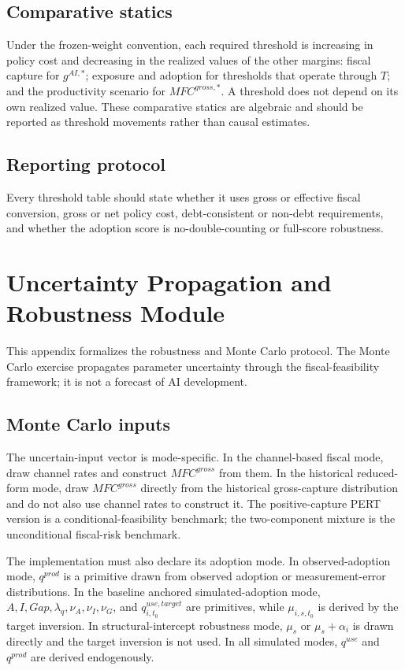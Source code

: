 \documentclass[11pt,a4paper]{article}
\begin{document}
\subsection{Comparative statics}

Under the frozen-weight convention, each required threshold is increasing in policy cost and decreasing in the realized values of the other margins: fiscal capture for $g^{AI,*}$; exposure and adoption for thresholds that operate through $T$; and the productivity scenario for $MFC^{gross,*}$. A threshold does not depend on its own realized value. These comparative statics are algebraic and should be reported as threshold movements rather than causal estimates.

\subsection{Reporting protocol}

Every threshold table should state whether it uses gross or effective fiscal conversion, gross or net policy cost, debt-consistent or non-debt requirements, and whether the adoption score is no-double-counting or full-score robustness.


\section{Uncertainty Propagation and Robustness Module}\label{app:uncertainty_module}

This appendix formalizes the robustness and Monte Carlo protocol. The Monte Carlo exercise propagates parameter uncertainty through the fiscal-feasibility framework; it is not a forecast of AI development.


\subsection{Monte Carlo inputs}

The uncertain-input vector is mode-specific. In the channel-based fiscal mode, draw channel rates and construct $MFC^{gross}$ from them. In the historical reduced-form mode, draw $MFC^{gross}$ directly from the historical gross-capture distribution and do not also use channel rates to construct it. The positive-capture PERT version is a conditional-feasibility benchmark; the two-component mixture is the unconditional fiscal-risk benchmark.

The implementation must also declare its adoption mode. In observed-adoption mode, $q^{prod}$ is a primitive drawn from observed adoption or measurement-error distributions. In the baseline anchored simulated-adoption mode, $A,I,Gap,\lambda_q,\nu_A,\nu_I,\nu_G$, and $q^{use,target}_{i,t_0}$ are primitives, while $\mu_{i,s,t_0}$ is derived by the target inversion. In structural-intercept robustness mode, $\mu_s$ or $\mu_s+\alpha_i$ is drawn directly and the target inversion is not used. In all simulated modes, $q^{use}$ and $q^{prod}$ are derived endogenously.
\end{document}
